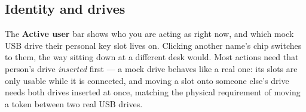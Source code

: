 \subsection{Identity and drives}

The \textbf{Active user} bar shows who you are acting as right now, and
which mock USB drive their personal key slot lives on. Clicking another
name's chip switches to them, the way sitting down at a different desk
would. Most actions need that person's drive \emph{inserted} first --- a
mock drive behaves like a real one: its slots are only usable while it is
connected, and moving a slot onto someone else's drive needs both drives
inserted at once, matching the physical requirement of moving a token
between two real USB drives.
